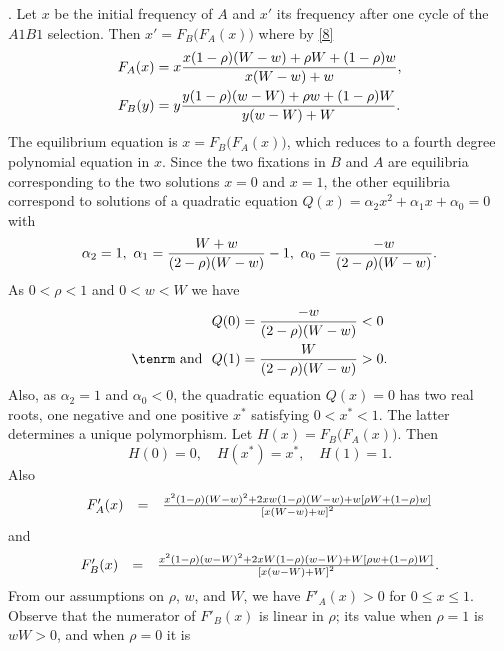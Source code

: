 \documentclass[9pt,twocolumn,twoside,lineno]{pnas-new}
\newcommand{\an}[1]{\begin{align}#1\end{align}}
\begin{document}
. Let $x$ be the initial frequency of $A$ and $x'$ its frequency  after one cycle of the $A1B1$ selection. Then $x' =F_B\bigl(F_A(x)\bigr)$ where by \eqref{8}
\begin{equation}
\an{
F_A(x)&=x{x(1-\rho)(W-w) +\rho W+(1-\rho)w\over x(W-w) +w},\\
F_B(y) &= y{y(1-\rho)(w-W) +\rho w+(1-\rho)W\over y(w-W)+W}.}
\label{21}\end{equation}
The equilibrium equation is $x=F_B\bigl(F_A(x)\bigr)$, which reduces to a fourth degree polynomial equation in $x$. Since the two fixations in $B$ and $A$ are equilibria corresponding to the two solutions $x=0$ and $x=1$, the other equilibria correspond to solutions of a quadratic equation $Q(x) =\alpha_2x^2 +\alpha_1x +\alpha_0=0$ with
\begin{equation}\alpha_2=1,\  \alpha_1={W+w\over (2-\rho)(W-w)}-1,\  \alpha_0={-w\over (2-\rho)(W-w)}.\label{22}\end{equation}
As $0<\rho<1$ and $0<w<W$ we have
\begin{equation}
\an{
Q(0) &= {-w\over (2-\rho)(W-w)}<0\\
\hbox{\tenrm and}\ \ Q(1) &={W\over (2-\rho)(W-w)} >0.}\label{23}\end{equation}
Also, as $\alpha_2=1$ and $\alpha_0<0$, the quadratic equation $Q(x)=0$ has two real roots, one negative and one positive $x^*$ satisfying $0<x^*<1$. The latter determines a unique polymorphism. Let $H(x) =F_B\bigl(F_A(x)\bigr)$. Then 
 \begin{equation}H(0)=0,\quad H(x^*)=x^*,\quad H(1)=1.\label{24}\end{equation}
 Also 
\begin{equation}\begin{array}{ccc}
F'_A(x) &=& {x^2(1-\rho)\left(W-w\right)^2 +2xw(1-\rho)(W-w) +w\left[\rho W +(1-\rho)w\right]\over \left[x(W-w) +w\right]^2}\\
 \end{array}\label{25}\end{equation}
 and
\begin{equation}\begin{array}{ccc}
F'_B(x) &=  &{x^2(1-\rho)\left(w-W\right)^2 +2xW(1-\rho)(w-W) +W\left[\rho w +(1-\rho)W\right]\over \left[x(w-W) +W\right]^2}.\\
\end{array}\label{26}\end{equation}
 From our assumptions on $\rho$, $w$, and $W$, we have $F'_A(x)>0$ for  $0\le x\le 1$. Observe that the numerator of $F'_B(x)$ is linear in $\rho$; its value when $\rho=1$ is $wW>0$, and when $\rho=0$ it is
\end{document}

